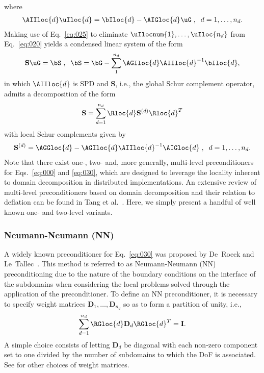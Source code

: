 \documentclass{article}
\begin{document}
where 
\begin{align}\label{eq:025}
\AIIloc{d}\uIloc{d}=\bIloc{d}-\AIGloc{d}\uG
\;,\;\;
d=1,\dots,n_d.
\end{align}
Making use of Eq.~\eqref{eq:025} to eliminate $\uIlocnum{1},\dots,\uIloc{n_d}$ from Eq.~\eqref{eq:020} yields a condensed linear system of the form
\begin{align}\label{eq:030}
\mathbf{S}\uG=\bS
\;,\;\;
\bS=\bG-\sum_{1}^{n_d}\AGIloc{d}\AIIloc{d}^{-1}\bIloc{d},
\end{align}
in which $\AIIloc{d}$ is SPD and $\mathbf{S}$, i.e., the global Schur complement operator, admits a decomposition of the form
\begin{align}
\mathbf{S}=\sum_{d=1}^{n_d}\Rloc{d}\mathbf{S}^{(d)}\Rloc{d}^T
\end{align}
with local Schur complements given by
\begin{align}
\mathbf{S}^{(d)}=
\AGGloc{d}-
\AGIloc{d}\AIIloc{d}^{-1}\AIGloc{d}
\;,\;\;
d=1,\dots,n_d.
\end{align}
Note that there exist one-, two- and, more generally, multi-level preconditioners for Eqs.~\eqref{eq:000} and \eqref{eq:030}, which are designed to leverage the locality inherent to domain decomposition in distributed implementations.
An extensive review of multi-level preconditioners based on domain decomposition and their relation to deflation can be found in Tang et al.~\cite{Tang2009}.
Here, we simply present a handful of well known one- and two-level variants.

\subsubsection{Neumann-Neumann (NN)}
A widely known preconditioner for Eq.~\eqref{eq:030} was proposed by De~Roeck and Le~Tallec~\cite{DeRoeck1991}.
This method is referred to as Neumann-Neumann (NN) preconditioning due to the nature of the boundary conditions on the interface of the subdomains when considering the local problems solved through the application of the preconditioner.
To define an NN preconditioner, it is necessary to specify weight matrices $\mathbf{D}_1,\dots,\mathbf{D}_{n_d}$ so as to form a partition of unity, i.e.,
\begin{align}
\sum_{d=1}^{n_d}
\RGloc{d}
\mathbf{D}_d
\RGloc{d}^T
=\mathbf{I}.
\end{align}
A simple choice consists of letting $\mathbf{D}_d$ be diagonal with each non-zero component set to one divided by the number of subdomains to which the DoF is associated.
See \cite{} for other choices of weight matrices.
\end{document}
